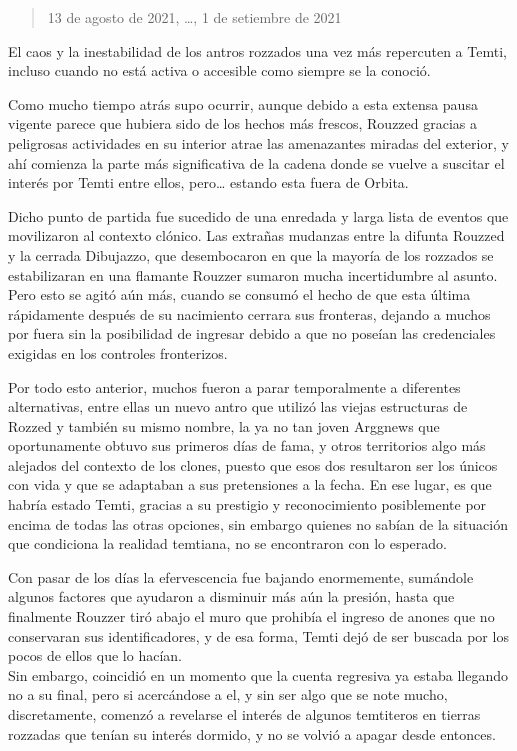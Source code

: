 \documentclass[
  spanish,
]{book}
\begin{document}
\begin{quote}
13 de agosto de 2021, \ldots, 1 de setiembre de 2021
\end{quote}

El caos y la inestabilidad de los antros rozzados una vez más repercuten a Temti, incluso cuando no está activa o accesible como siempre se la conoció.

Como mucho tiempo atrás supo ocurrir, aunque debido a esta extensa pausa vigente parece que hubiera sido de los hechos más frescos, Rouzzed gracias a peligrosas actividades en su interior atrae las amenazantes miradas del exterior, y ahí comienza la parte más significativa de la cadena donde se vuelve a suscitar el interés por Temti entre ellos, pero\ldots{} estando esta fuera de Orbita.

Dicho punto de partida fue sucedido de una enredada y larga lista de eventos que movilizaron al contexto clónico. Las extrañas mudanzas entre la difunta Rouzzed y la cerrada Dibujazzo, que desembocaron en que la mayoría de los rozzados se estabilizaran en una flamante Rouzzer sumaron mucha incertidumbre al asunto. Pero esto se agitó aún más, cuando se consumó el hecho de que esta última rápidamente después de su nacimiento cerrara sus fronteras, dejando a muchos por fuera sin la posibilidad de ingresar debido a que no poseían las credenciales exigidas en los controles fronterizos.

Por todo esto anterior, muchos fueron a parar temporalmente a diferentes alternativas, entre ellas un nuevo antro que utilizó las viejas estructuras de Rozzed y también su mismo nombre, la ya no tan joven Arggnews que oportunamente obtuvo sus primeros días de fama, y otros territorios algo más alejados del contexto de los clones, puesto que esos dos resultaron ser los únicos con vida y que se adaptaban a sus pretensiones a la fecha. En ese lugar, es que habría estado Temti, gracias a su prestigio y reconocimiento posiblemente por encima de todas las otras opciones, sin embargo quienes no sabían de la situación que condiciona la realidad temtiana, no se encontraron con lo esperado.

Con pasar de los días la efervescencia fue bajando enormemente, sumándole algunos factores que ayudaron a disminuir más aún la presión, hasta que finalmente Rouzzer tiró abajo el muro que prohibía el ingreso de anones que no conservaran sus identificadores, y de esa forma, Temti dejó de ser buscada por los pocos de ellos que lo hacían.\\
Sin embargo, coincidió en un momento que la cuenta regresiva ya estaba llegando no a su final, pero si acercándose a el, y sin ser algo que se note mucho, discretamente, comenzó a revelarse el interés de algunos temtiteros en tierras rozzadas que tenían su interés dormido, y no se volvió a apagar desde entonces.
\end{document}
